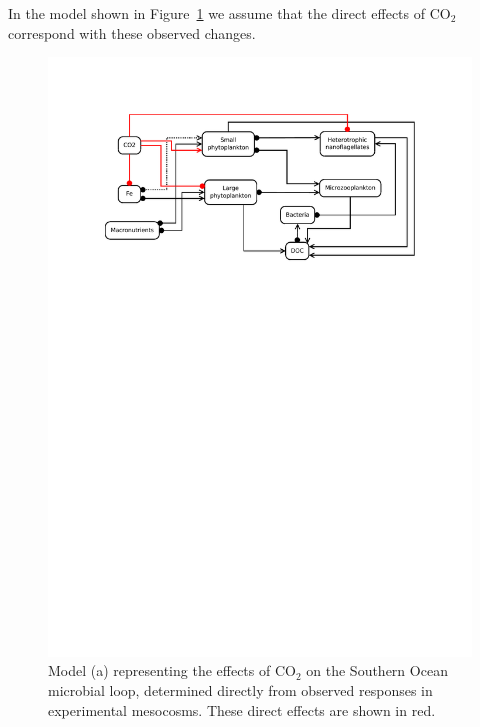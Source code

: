 \documentclass[a4paper]{article}\usepackage[]{graphicx}\usepackage[]{color}
\begin{document}
In the model shown in Figure~\ref{fig:Antarctic-a} we assume that the direct
effects of $\mathrm{CO}_{2}$ correspond with these observed changes.
\vspace{1cm}

\begin{figure}[ht]
  \centering
  \includegraphics{Antarctic-a.pdf}
  \caption{Model (a) representing the effects of $\mathrm{CO}_{2}$ on the Southern Ocean
  microbial loop, determined directly from observed responses in experimental
  mesocosms. These direct effects are shown in red.}
  \label{fig:Antarctic-a}
\end{figure}
\vspace{1cm}
\end{document}

